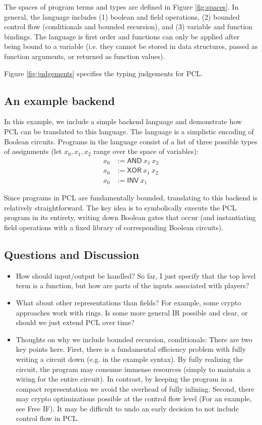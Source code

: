 \documentclass[11pt]{article}
\newcommand{\kw}[1]{\textsf{#1}}
\begin{document}
The spaces of program terms and types are defined in Figure \ref{fig:spaces}.
%
In general, the language includes (1) boolean and field operations, (2) bounded control flow (conditionals and bounded recursion), and (3) variable and function bindings.
The language is first order and functions can only be applied after being bound to a variable (i.e. they cannot be stored in data structures, passed as function arguments, or returned as function values).

Figure \ref{fig:judgements} specifies the typing judgements for PCL.

\subsection{An example backend}

In this example, we include a simple backend language and demonstrate how PCL can be translated to this language.
The language is a simplistic encoding of Boolean circuits.
Programs in the language consist of a list of three possible types of assignments (let $x_0, x_1, x_2$ range over the space of variables):
\begin{align*}
  x_0 &:= \kw{AND}~x_1~x_2\\
  x_0 &:= \kw{XOR}~x_1~x_2\\
  x_0 &:= \kw{INV}~x_1
\end{align*}

Since programs in PCL are fundamentally bounded, translating to this backend is relatively straightforward.
The key idea is to symbolically execute the PCL program in its entirety, writing down Boolean gates that occur (and instantiating field operations with a fixed library of corresponding Boolean circuits).

\subsection{Questions and Discussion}

\begin{itemize}
  \item How should input/output be handled? So far, I just specify that the top level term is a function, but how are parts of the inputs associated with players?
  \item What about other representations than fields? For example, some crypto approaches work with rings. Is some more general IR possible and clear, or should we just extend PCL over time?
  \item Thoughts on why we include bounded recursion, conditionals: There are two key points here.
  	First, there is a fundamental efficiency problem with fully writing a circuit down (e.g. in the example syntax).
  	By fully realizing the circuit, the program may consume immense resources (simply to maintain a wiring for the entire circuit).
  	In contrast, by keeping the program in a compact representation we avoid the overhead of fully inlining.
  	Second, there may crypto optimizations possible at the control flow level (For an example, see Free IF).
  	It may be difficult to undo an early decision to not include control flow in PCL.
\end{itemize}
\end{document}
